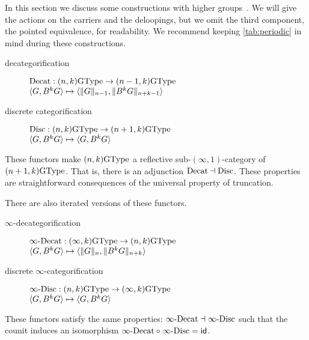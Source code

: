 In this section we discuss some constructions with higher groups~\cite{BaezDolan1998}. We will give the actions on the carriers and the deloopings, but we omit the third component, the pointed equivalence, for readability. We recommend keeping \autoref{tab:periodic} in mind during these constructions.
\begin{description}
\item[decategorification] $\Decat : (n,k)\GType \to (n-1,k)\GType$\\
  $\angled{G,B^kG} \mapsto \angled{\trunc{n-1}{G}, \trunc{n+k-1}{B^kG}}$
\item[discrete categorification] $\Disc : (n,k)\GType \to (n+1,k)\GType$ \\
  $\angled{G,B^kG} \mapsto \angled{G,B^kG}$
\end{description}
These functors make $(n,k)\GType$ a reflective sub-$(\infty,1)$-category of $(n+1,k)\GType$. That is, there is an adjunction ${\Decat} \dashv {\Disc}$. These properties are straightforward consequences of the universal property of truncation.

There are also iterated versions of these functors.
\begin{description}
  \item[$\infty$-decategorification] $\iDecat : (\infty,k)\GType \to (n,k)\GType$\\
    $\angled{G,B^kG} \mapsto \angled{\trunc{n}{G}, \trunc{n+k}{B^kG}}$
  \item[discrete $\infty$-categorification] $\iDisc : (n,k)\GType \to (\infty,k)\GType$ \\
    $\angled{G,B^kG} \mapsto \angled{G,B^kG}$
\end{description}
These functors satisfy the same properties: ${\iDecat} \dashv {\iDisc}$ such that the counit induces an isomorphism ${\iDecat} \circ {\iDisc} = \idfunc$.


